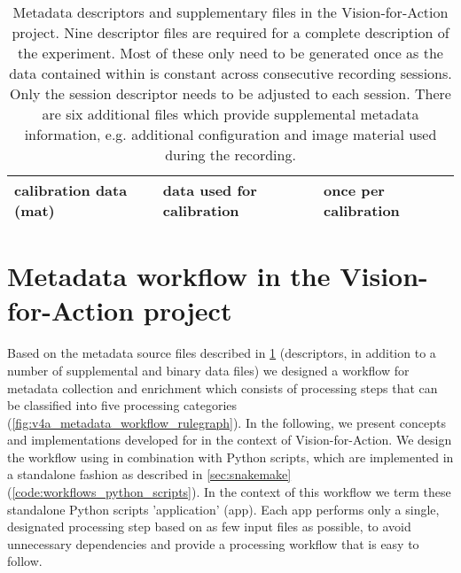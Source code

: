\begin{table}[]
\begin{tabular}{lll}
\multicolumn{1}{l}{calibration data (mat)}       & \multicolumn{1}{l}{data used for calibration}                                                                         & \multicolumn{1}{l}{once per calibration}                                            \\ \hline
\end{tabular}
\caption[Metadata files in the Vision-for-Action project]{Metadata descriptors and supplementary files in the Vision-for-Action project. Nine  descriptor files are required for a complete description of the experiment. Most of these only need to be generated once as the data contained within is constant across consecutive recording sessions. Only the session descriptor needs to be adjusted to each session. There are six additional files which provide supplemental metadata information, e.g. additional configuration and image material used during the recording.}
\label{tab:v4a_metadata_files}
\end{table}

\section{Metadata workflow in the Vision-for-Action project}

Based on the metadata source files described in \cref{tab:v4a_metadata_files} (descriptors, in addition to a number of supplemental and binary data files) we designed a workflow for metadata collection and enrichment which consists of processing steps that can be classified into five processing categories (\cref{fig:v4a_metadata_workflow_rulegraph}). In the following, we present concepts and implementations developed for in the context of Vision-for-Action. We design the workflow using  in combination with Python scripts, which are implemented in a standalone fashion as described in \cref{sec:snakemake} (\cref{code:workflows_python_scripts}). In the context of this workflow we term these standalone Python scripts 'application' (app). Each app performs only a single, designated processing step based on as few input files as possible, to avoid unnecessary dependencies and provide a processing workflow that is easy to follow.

